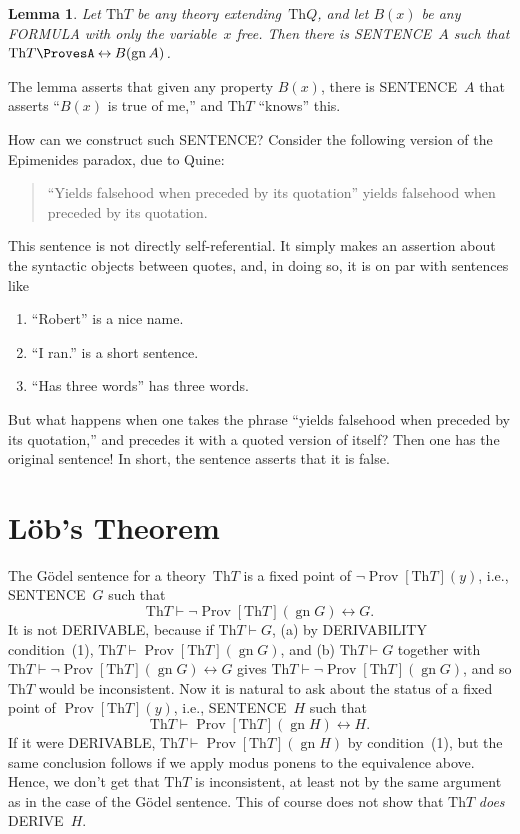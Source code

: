\documentclass[10pt,a4paper]{article}
\newcommand*{\olup}[1]{\MakeUppercase{#1}}
\theoremstyle{plain}
\newtheorem{lem}[thm]{Lemma}
\theoremstyle{definition}
\theoremstyle{remark}
\newcommand*{\olfileid}[3]{}
\newcommand*{\olsection}[1]{\section*{#1}}
\providecommand{\Proves}{\mathrel{\vdash}}
\providecommand{\Th}{\ensuremath{\mathrm{Th}}}
\providecommand{\gn}{\operatorname{gn}}
\providecommand{\liff}{\mathbin{\leftrightarrow}}
\providecommand{\OProv}{\operatorname{Prov}}
\begin{document}
\begin{lem}
Let $\Th{T}$ be any theory extending~$\Th{Q}$, and let $B(x)$ be any
\olup{formula} with only the variable~$x$ free. Then there is
\olup{sentence}~$A$ such that $\Th{T} \ProvesA \liff B(\gn{A})$.
\end{lem}

The lemma asserts that given any property $B(x)$, there is
\olup{sentence}~$A$ that asserts ``$B(x)$ is true of me,'' and
$\Th{T}$ ``knows'' this.

How can we construct such \olup{sentence}? Consider the following version
of the Epimenides paradox, due to Quine:
\begin{quote}
``Yields falsehood when preceded by its quotation'' yields falsehood
when preceded by its quotation.
\end{quote}
This sentence is not directly self-referential. It simply makes an
assertion about the syntactic objects between quotes, and, in doing
so, it is on par with sentences like
\begin{enumerate}
\item ``Robert'' is a nice name.
\item ``I ran.'' is a short sentence.
\item ``Has three words'' has three words.
\end{enumerate}
But what happens when one takes the phrase ``yields falsehood when
preceded by its quotation,'' and precedes it with a quoted version of
itself? Then one has the original sentence!{} In short, the sentence
asserts that it is false.





\olfileid{inc}{inp}{lob}

\olsection{L\"ob's Theorem}

The G\"odel sentence for a theory~$\Th{T}$ is a fixed point of $\lnot
\OProv[\Th{T}](y)$, i.e., \olup{sentence}~$G$ such that
\[
\Th{T} \Proves \lnot \OProv[\Th{T}](\gn{G}) \liff G.
\]
It is not \olup{derivable}, because if $\Th{T} \Proves G$, (a) by \olup{derivability}
condition~(1), $\Th{T} \Proves \OProv[\Th{T}](\gn{G})$, and (b) $\Th{T}
\Proves G$ together with $\Th{T} \Proves \lnot \OProv[\Th{T}](\gn{G})
\liff G$ gives $\Th{T} \Proves \lnot \OProv[\Th{T}](\gn{G})$, and so
$\Th{T}$ would be inconsistent.  Now it is natural to ask about the
status of a fixed point of $\OProv[\Th{T}](y)$, i.e., \olup{sentence}~$H$
such that
\[
\Th{T} \Proves \OProv[\Th{T}](\gn{H}) \liff H.
\]
If it were \olup{derivable}, $\Th{T} \Proves \OProv[\Th{T}](\gn{H})$ by
condition~(1), but the same conclusion follows if we apply modus
ponens to the equivalence above. Hence, we don't get that $\Th{T}$ is
inconsistent, at least not by the same argument as in the case of the
G\"odel sentence. This of course does not show that $\Th{T}$
\emph{does} \olup{derive}~$H$.
\end{document}
